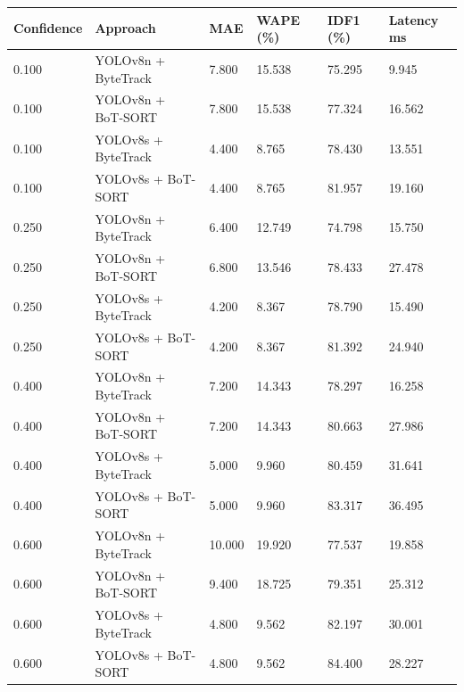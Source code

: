 \begin{tabular}{llllll}
\toprule
Confidence & Approach & MAE & WAPE (\%) & IDF1 (\%) & Latency ms \\
\midrule
0.100 & YOLOv8n + ByteTrack & 7.800 & 15.538 & 75.295 & 9.945 \\
0.100 & YOLOv8n + BoT-SORT & 7.800 & 15.538 & 77.324 & 16.562 \\
0.100 & YOLOv8s + ByteTrack & 4.400 & 8.765 & 78.430 & 13.551 \\
0.100 & YOLOv8s + BoT-SORT & 4.400 & 8.765 & 81.957 & 19.160 \\
0.250 & YOLOv8n + ByteTrack & 6.400 & 12.749 & 74.798 & 15.750 \\
0.250 & YOLOv8n + BoT-SORT & 6.800 & 13.546 & 78.433 & 27.478 \\
0.250 & YOLOv8s + ByteTrack & 4.200 & 8.367 & 78.790 & 15.490 \\
0.250 & YOLOv8s + BoT-SORT & 4.200 & 8.367 & 81.392 & 24.940 \\
0.400 & YOLOv8n + ByteTrack & 7.200 & 14.343 & 78.297 & 16.258 \\
0.400 & YOLOv8n + BoT-SORT & 7.200 & 14.343 & 80.663 & 27.986 \\
0.400 & YOLOv8s + ByteTrack & 5.000 & 9.960 & 80.459 & 31.641 \\
0.400 & YOLOv8s + BoT-SORT & 5.000 & 9.960 & 83.317 & 36.495 \\
0.600 & YOLOv8n + ByteTrack & 10.000 & 19.920 & 77.537 & 19.858 \\
0.600 & YOLOv8n + BoT-SORT & 9.400 & 18.725 & 79.351 & 25.312 \\
0.600 & YOLOv8s + ByteTrack & 4.800 & 9.562 & 82.197 & 30.001 \\
0.600 & YOLOv8s + BoT-SORT & 4.800 & 9.562 & 84.400 & 28.227 \\
\bottomrule
\end{tabular}
